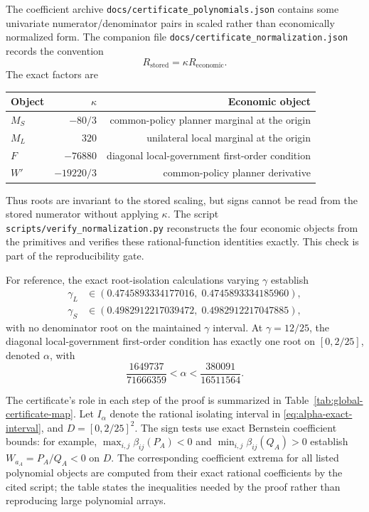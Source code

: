 The coefficient archive \texttt{docs/certificate\_polynomials.json} contains some univariate numerator/denominator pairs in scaled rather than economically normalized form. The companion file \texttt{docs/certificate\_normalization.json} records the convention
\begin{equation}
R_{\mathrm{stored}}=\kappa R_{\mathrm{economic}}.
\end{equation}
The exact factors are
\begin{center}
\begin{tabular}{lrr}
\toprule
Object & $\kappa$ & Economic object \\
\midrule
$M_S$ & $-80/3$ & common-policy planner marginal at the origin \\
$M_L$ & $320$ & unilateral local marginal at the origin \\
$F$ & $-76880$ & diagonal local-government first-order condition \\
$W'$ & $-19220/3$ & common-policy planner derivative \\
\bottomrule
\end{tabular}
\end{center}
Thus roots are invariant to the stored scaling, but signs cannot be read from the stored numerator without applying $\kappa$. The script \texttt{scripts/verify\_normalization.py} reconstructs the four economic objects from the primitives and verifies these rational-function identities exactly. This check is part of the reproducibility gate.

For reference, the exact root-isolation calculations varying $\gamma$ establish
\begin{align}
\gamma_L&\in(0.4745893334177016,\;0.4745893334185960),\\
\gamma_S&\in(0.4982912217039472,\;0.4982912217047885),
\end{align}
with no denominator root on the maintained $\gamma$ interval. At $\gamma=12/25$, the diagonal local-government first-order condition has exactly one root on $[0,2/25]$, denoted $\alpha$, with
\begin{equation}
\frac{1649737}{71666359}<\alpha<\frac{380091}{16511564}.
\label{eq:alpha-exact-interval}
\end{equation}

The certificate's role in each step of the proof is summarized in Table~\ref{tab:global-certificate-map}. Let $I_\alpha$ denote the rational isolating interval in \eqref{eq:alpha-exact-interval}, and $D=[0,2/25]^2$. The sign tests use exact Bernstein coefficient bounds: for example, $\max_{i,j}\beta_{ij}(P_A)<0$ and $\min_{i,j}\beta_{ij}(Q_A)>0$ establish $W_{a_A}=P_A/Q_A<0$ on $D$. The corresponding coefficient extrema for all listed polynomial objects are computed from their exact rational coefficients by the cited script; the table states the inequalities needed by the proof rather than reproducing large polynomial arrays.

